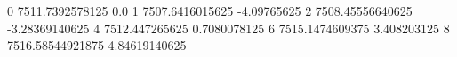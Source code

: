 0 7511.7392578125 0.0
1 7507.6416015625 -4.09765625
2 7508.45556640625 -3.28369140625
4 7512.447265625 0.7080078125
6 7515.1474609375 3.408203125
8 7516.58544921875 4.84619140625
